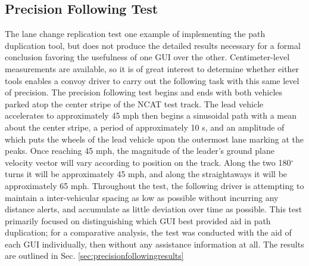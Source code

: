 \documentclass[12pt]{report}
\begin{document}
\subsection{Precision Following Test} \label{sec:targetspacingtest}
The lane change replication test one example of implementing the path duplication tool, but does not produce the detailed results necessary for a formal conclusion favoring the usefulness of one GUI over the other. Centimeter-level measurements are available, so it is of great interest to determine whether either tools enables a convoy driver to carry out the following task with this same level of precision. The precision following test begins and ends with both vehicles parked atop the center stripe of the NCAT test track. The lead vehicle accelerates to approximately 45 mph then begins a sinusoidal path with a mean about the center stripe, a period of approximately 10 s, and an amplitude of which puts the wheels of the lead vehicle upon the outermost lane marking at the peaks. Once reaching 45 mph, the magnitude of the leader's ground plane velocity vector will vary according to position on the track. Along the two 180$^\circ$ turns it will be approximately 45 mph, and along the straightaways it will be approximately 65 mph. Throughout the test, the following driver is attempting to maintain a inter-vehicular spacing as low as possible without incurring any distance alerts, and accumulate as little deviation over time as possible. 
This test primarily focused on distinguishing which GUI best provided aid in path duplication; for a comparative analysis, the test was conducted with the aid of each GUI individually, then without any assistance information at all. The results are outlined in Sec. \ref{sec:precisionfollowingresults}

\end{document}
